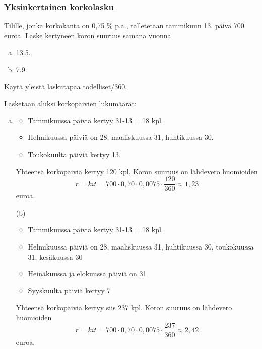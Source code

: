 \documentclass[]{beamer}
\begin{document}
\begin{frame}
    \frametitle{Yksinkertainen korkolasku}
    \begin{esim}
        Tilille, jonka korkokanta on 0,75 \% p.a., talletetaan tammikuun 13. päivä 700 euroa. \pause
        Laske kertyneen koron suuruus samana vuonna
        \begin{enumerate}[(a)]
            \item 13.5.
            \item 7.9.
        \end{enumerate}
        Käytä yleistä laskutapaa todelliset/360.
    \end{esim}
\end{frame}

\begin{frame}
    \begin{ratkaisu}
      Lasketaan aluksi korkopäivien lukumäärät:
        \begin{enumerate}[(a)]
            \item\pause
                \begin{itemize}
                    \item Tammikuussa päiviä kertyy 31-13 = 18 kpl.
                    \item Helmikuussa päiviä on 28, maaliskuussa 31, huhtikuussa 30.
                    \item Toukokuulta päiviä kertyy 13.
                \end{itemize}\pause
            Yhteensä korkopäiviä kertyy 120 kpl. Koron suuruus on lähdevero huomioiden\pause
            \[
                r = kit = 700\cdot 0,70\cdot0,0075\cdot\frac{120}{360} \approx 1,23
            \]
            euroa.
        \end{enumerate}
    \end{ratkaisu}
\end{frame}

\begin{frame}
    \begin{ratkaisu}
        \begin{itemize}
            \item[(b)]\pause
                \begin{itemize}
                    \item Tammikuussa päiviä kertyy 31-13 = 18 kpl.
                    \item Helmikuussa päiviä on 28, maaliskuussa 31, huhtikuussa 30, toukokuussa 31, kesäkuussa 30
                    \item Heinäkuussa ja elokuussa päiviä on 31
                    \item Syyskuulta päiviä kertyy 7
                \end{itemize}
            \pause Yhteensä korkopäiviä kertyy siis 237 kpl. \pause Koron suuruus on lähdevero huomioiden
            \[
                r = kit = 700\cdot 0,70\cdot0,0075\cdot\frac{237}{360} \approx 2,42
            \]
            euroa.
        \end{itemize}
    \end{ratkaisu}
\end{frame}
\end{document}
